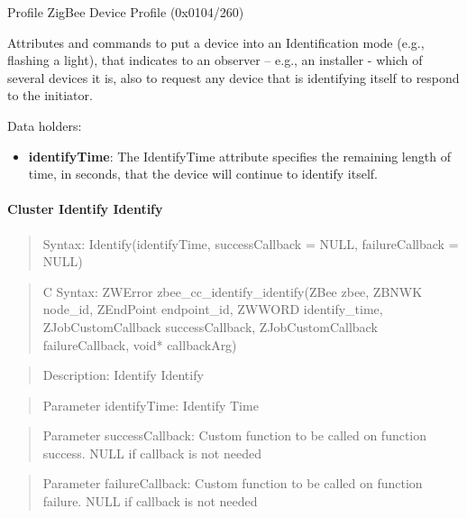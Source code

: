 Profile ZigBee Device Profile (0x0104/260)

Attributes and commands to put a device into an Identification mode (e.g., flashing a light), that indicates to an observer – e.g., an installer - which of several devices it is, also to request any device that is identifying itself to respond to the initiator.
\newline

\noindent
Data holders:

\begin{itemize}
\item \textbf{identifyTime}: The IdentifyTime attribute specifies the remaining length of time, in seconds, that the device will continue to identify itself.
\end{itemize}

\paragraph{Cluster Identify Identify}
\begin{quote}Syntax: Identify(identifyTime, successCallback = NULL, failureCallback = NULL)\end{quote}
\begin{quote}C Syntax: ZWError zbee\_cc\_identify\_identify(ZBee zbee, ZBNWK node\_id, ZEndPoint endpoint\_id, ZWWORD identify\_time, ZJobCustomCallback successCallback, ZJobCustomCallback failureCallback, void* callbackArg)\end{quote}
\begin{quote}Description: Identify Identify\end{quote}
\begin{quote}Parameter identifyTime: Identify Time\end{quote}
\begin{quote}Parameter successCallback: Custom function to be called on function success. NULL if callback is not needed\end{quote}
\begin{quote}Parameter failureCallback: Custom function to be called on function failure. NULL if callback is not needed\end{quote}


